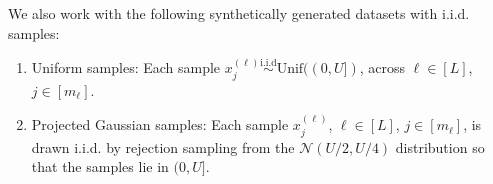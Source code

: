 \documentclass[conference,letterpaper]{IEEEtran}
\theoremstyle{remark}
\theoremstyle{definition}
\begin{document}
We also work with the following synthetically generated datasets with i.i.d. samples:
\begin{enumerate}
	\item Uniform samples: Each sample $x_j^{(\ell)}\stackrel{\text{i.i.d}}{\sim} \text{Unif}((0,U])$, across $\ell\in [L]$, $j\in [m_\ell]$. 
	\item Projected Gaussian samples: Each sample $x_j^{(\ell)}$, $\ell\in [L]$, $j\in [m_\ell]$, is drawn i.i.d. by rejection sampling from the $\mathcal{N}(U/2,U/4)$ distribution so that the samples lie in $(0,U]$. 
\end{enumerate}
\end{document}

